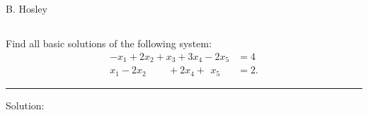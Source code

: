 \documentclass[12pt]{amsart}
\begin{document}
	\raggedbottom

\hspace{\fill} {\large B. Hosley}
\bigskip


\setcounter{section}{2}
\setcounter{subsection}{23}
\subsection{}
Find all basic solutions of the following system:
\begin{align*}
	-x_1 + 2x_2  + x_3   + 3x_4 -    2x_5 &= 4 \\
	 x_1 - 2x_2 \qquad\, + 2x_4 + \,\ x_5 &= 2.
\end{align*}

\hrule \medskip
Solution:
\end{document}
